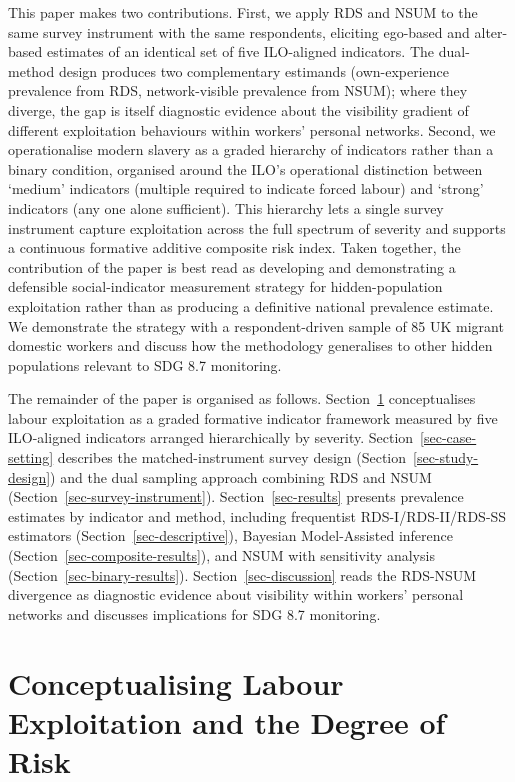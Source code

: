 \documentclass[
  12pt,
  letterpaper,
  DIV=11,
  numbers=noendperiod]{scrartcl}
\begin{document}
This paper makes two contributions. First, we apply RDS and NSUM to the
same survey instrument with the same respondents, eliciting ego-based
and alter-based estimates of an identical set of five ILO-aligned
indicators. The dual-method design produces two complementary estimands
(own-experience prevalence from RDS, network-visible prevalence from
NSUM); where they diverge, the gap is itself diagnostic evidence about
the visibility gradient of different exploitation behaviours within
workers' personal networks. Second, we operationalise modern slavery as
a graded hierarchy of indicators rather than a binary condition,
organised around the ILO's operational distinction
\autocite{ILO11-indicators,international_labour_organization_global_2017}
between `medium' indicators (multiple required to indicate forced
labour) and `strong' indicators (any one alone sufficient). This
hierarchy lets a single survey instrument capture exploitation across
the full spectrum of severity and supports a continuous formative
additive composite risk index. Taken together, the contribution of the
paper is best read as developing and demonstrating a defensible
social-indicator measurement strategy for hidden-population exploitation
rather than as producing a definitive national prevalence estimate. We
demonstrate the strategy with a respondent-driven sample of 85 UK
migrant domestic workers and discuss how the methodology generalises to
other hidden populations relevant to SDG 8.7 monitoring.

The remainder of the paper is organised as follows.
Section~\ref{sec-conceptualisation} conceptualises labour exploitation
as a graded formative indicator framework measured by five ILO-aligned
indicators arranged hierarchically by severity.
Section~\ref{sec-case-setting} describes the matched-instrument survey
design (Section~\ref{sec-study-design}) and the dual sampling approach
combining RDS and NSUM (Section~\ref{sec-survey-instrument}).
Section~\ref{sec-results} presents prevalence estimates by indicator and
method, including frequentist RDS-I/RDS-II/RDS-SS estimators
(Section~\ref{sec-descriptive}), Bayesian Model-Assisted inference
(Section~\ref{sec-composite-results}), and NSUM with sensitivity
analysis (Section~\ref{sec-binary-results}).
Section~\ref{sec-discussion} reads the RDS-NSUM divergence as diagnostic
evidence about visibility within workers' personal networks and
discusses implications for SDG 8.7 monitoring.

\section{Conceptualising Labour Exploitation and the Degree of
Risk}\label{sec-conceptualisation}
\end{document}
